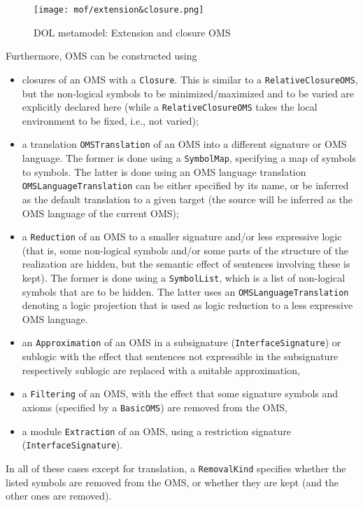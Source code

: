 \documentclass[10pt, a4paper]{isov2}
\newcommand*{\termref}[1]{\index{#1}#1\xspace}
\newcommand*{\syntax}[1]{\texttt{#1}}
\begin{document}
\medskip
\begin{figure}
  \centering
    \texttt{[image: mof/extension\&closure.png]}
  \caption{DOL metamodel: Extension and closure OMS}
  \label{fig:extension&closure}
\end{figure}


Furthermore, OMS can be constructed using
\begin{itemize}
\item  closures of an OMS with a \syntax{Closure}.  This is
  similar to a \syntax{RelativeClo\-sureOMS}, but the non-logical
  symbols to be  minimized/maximized and to be varied are
  explicitly declared here (while a \syntax{RelativeClosureOMS} takes
  the local environment to be fixed, i.e., not varied);
\item a translation \syntax{OMSTranslation} of an OMS into a different
  signature or OMS language. The former is done using a \syntax{SymbolMap},
  specifying a map of symbols to symbols. The latter is done using an
  OMS language
  translation \syntax{OMSLanguageTranslation} can be either specified
  by its name, or be inferred as the \termref{default translation} to
  a given target (the source will be inferred as the OMS language of
  the current OMS);
\item a \syntax{Reduction} of an OMS to a smaller signature and/or
  less expressive logic (that is, some non-logical symbols and/or some
  parts of the structure of the realization are hidden,
  but the semantic effect of
  sentences involving these is kept). The former is done using a
  \syntax{SymbolList}, which is a list of non-logical symbols that are
  to be hidden. The latter uses an \syntax{OMSLanguageTranslation}
  denoting a logic projection that is used as logic reduction to a
  less expressive OMS language.
\item an \syntax{Approximation} of an OMS in a sub\-signature (\syntax{InterfaceSignature}) or sublogic with the effect that sentences not expressible in the subsignature respectively sublogic are replaced with a suitable approximation,
\item a \syntax{Filtering} of an OMS, with the effect that some signature symbols and axioms (specified by a \syntax{BasicOMS}) are removed from the OMS,
\item a module \syntax{Extraction} of an OMS, using a restriction signature (\syntax{Inter\-faceSignature}).
\end{itemize}
In all of these cases except for translation, a \syntax{RemovalKind}
specifies whether the listed symbols are removed from the OMS, or
whether they are kept (and the other ones are removed).
\end{document}
